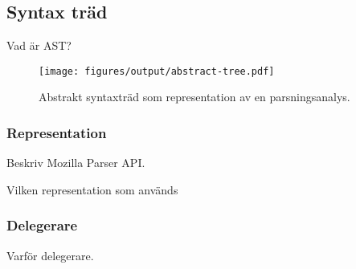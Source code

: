 %
%
%

%
%

\subsection{Syntax träd}

Vad är AST?

\begin{figure}[ht]
  \texttt{[image: figures/output/abstract-tree.pdf]}
  \caption{Abstrakt syntaxträd som representation av en parsningsanalys.}
\end{figure}

\subsubsection{Representation}

Beskriv Mozilla Parser API.

Vilken representation som används

\subsubsection{Delegerare}

Varför delegerare.

%
%
%
%

